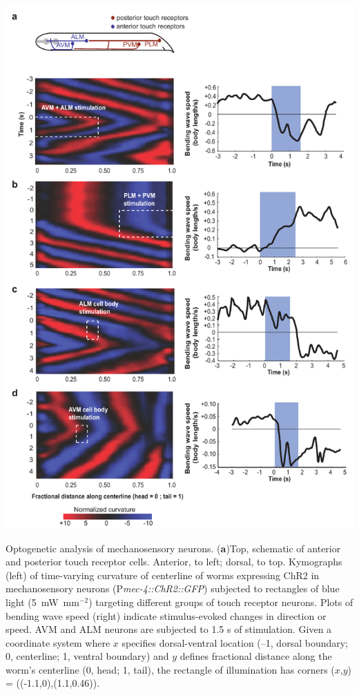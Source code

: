 \begin{FPfigure} 
\includegraphics[width=\textwidth]{figures/colbert4}
\caption[Optogenetic analysis of mechanosensory neurons. ]{ Optogenetic analysis of mechanosensory neurons.  (\textbf{a})Top, schematic of anterior and posterior touch receptor cells. 
Anterior, to left; dorsal, to top. Kymographs (left) of time-varying curvature of centerline of worms expressing ChR2 in mechanosensory neurons (P\textit{mec-4::ChR2::GFP}) subjected to rectangles of blue light (5~mW~mm$^{-2}$) targeting different groups of touch receptor neurons. Plots of bending wave speed (right) indicate stimulus-evoked changes in direction or speed. AVM and ALM neurons are subjected to 1.5 s of stimulation. Given a coordinate system where $x$ specifies dorsal-ventral location (–1, dorsal boundary; 0, centerline; 1, ventral boundary) and $y$ defines fractional distance along the worm's centerline (0, head; 1, tail), the rectangle of illumination has corners ($x$,$y$) = ((-1.1,0),(1.1,0.46)). 
}
\end{FPfigure}
